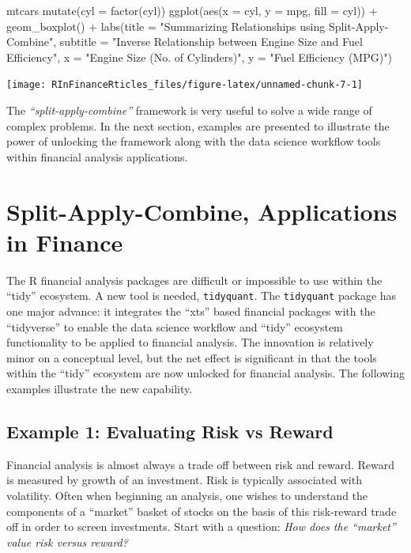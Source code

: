 \begin{Schunk}
\begin{Sinput}
mtcars %
    mutate(cyl = factor(cyl)) %
    ggplot(aes(x = cyl, y = mpg, fill = cyl)) +
    geom_boxplot() +
    labs(title = "Summarizing Relationships using Split-Apply-Combine",
         subtitle = "Inverse Relationship between Engine Size and Fuel Efficiency",
         x = "Engine Size (No. of Cylinders)",
         y = "Fuel Efficiency (MPG)")
\end{Sinput}


\begin{center}\texttt{[image: RInFinanceRticles\_files/figure-latex/unnamed-chunk-7-1]} \end{center}

\end{Schunk}

The \emph{``split-apply-combine''} framework is very useful to solve a
wide range of complex problems. In the next section, examples are
presented to illustrate the power of unlocking the framework along with
the data science workflow tools within financial analysis applications.

\section{Split-Apply-Combine, Applications in
Finance}\label{split-apply-combine-applications-in-finance}

The R financial analysis packages are difficult or impossible to use
within the ``tidy'' ecosystem. A new tool is needed, \texttt{tidyquant}.
The \texttt{tidyquant} package has one major advance: it integrates the
``xts'' based financial packages with the ``tidyverse'' to enable the
data science workflow and ``tidy'' ecosystem functionality to be applied
to financial analysis. The innovation is relatively minor on a
conceptual level, but the net effect is significant in that the tools
within the ``tidy'' ecosystem are now unlocked for financial analysis.
The following examples illustrate the new capability.

\subsection{Example 1: Evaluating Risk vs
Reward}\label{example-1-evaluating-risk-vs-reward}

Financial analysis is almost always a trade off between risk and reward.
Reward is measured by growth of an investment. Risk is typically
associated with volatility. Often when beginning an analysis, one wishes
to understand the components of a ``market'' basket of stocks on the
basis of this risk-reward trade off in order to screen investments.
Start with a question: \emph{How does the ``market'' value risk versus
reward?}

